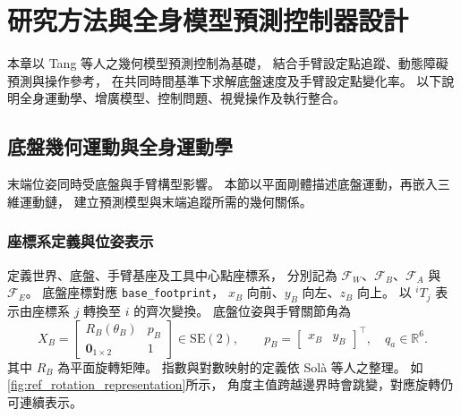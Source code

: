 \chapter{研究方法與全身模型預測控制器設計}
\label{c:methodology}
\label{c:Mathodology}

本章以 Tang 等人\cite{tang2024gmpc}之幾何模型預測控制為基礎，
結合手臂設定點追蹤、動態障礙預測與操作參考，
在共同時間基準下求解底盤速度及手臂設定點變化率。
以下說明全身運動學、增廣模型、控制問題、視覺操作及執行整合。

\section{底盤幾何運動與全身運動學}
\label{sec:wholebody_kinematics}

末端位姿同時受底盤與手臂構型影響。
本節以平面剛體描述底盤運動，再嵌入三維運動鏈，
建立預測模型與末端追蹤所需的幾何關係。

\subsection{座標系定義與位姿表示}
\label{subsec:frames_pose_representation}

定義世界、底盤、手臂基座及工具中心點座標系，
分別記為 $\mathcal F_W$、$\mathcal F_B$、$\mathcal F_A$ 與 $\mathcal F_E$。
底盤座標對應 \texttt{base\_footprint}，
$x_B$ 向前、$y_B$ 向左、$z_B$ 向上。
以 $ {}^iT_j$ 表示由座標系 $j$ 轉換至 $i$ 的齊次變換。
底盤位姿與手臂關節角為
\begin{equation}
    X_B=
    \begin{bmatrix}
        R_B(\theta_B)&p_B\\
        \mathbf 0_{1\times2}&1
    \end{bmatrix}\in\mathrm{SE}(2),
    \qquad
    p_B=\begin{bmatrix}x_B&y_B\end{bmatrix}^{\top},
    \quad q_a\in\mathbb R^6 .
    \label{eq:ch3_base_pose}
\end{equation}
其中 $R_B$ 為平面旋轉矩陣。
指數與對數映射的定義依 Sol\`a 等人\cite{sola2018micro}之整理。
如\cref{fig:ref_rotation_representation}所示，
角度主值跨越邊界時會跳變，對應旋轉仍可連續表示。

